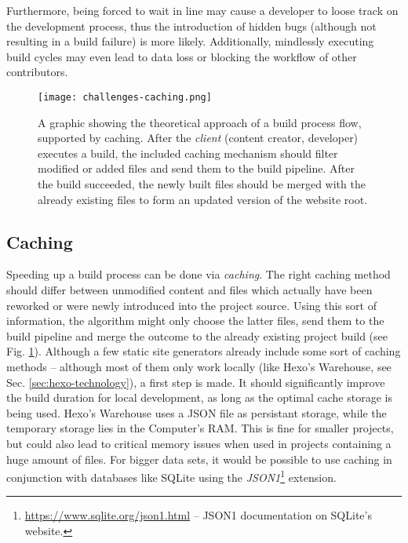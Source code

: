 Furthermore, being forced to wait in line may cause a developer to loose track on the development process, thus the introduction of hidden bugs (although not resulting in a build failure) is more likely. Additionally, mindlessly executing build cycles may even lead to data loss or blocking the workflow of other contributors.

\begin{figure} %
    \centering
    \texttt{[image: challenges-caching.png]}
    \caption{A graphic showing the theoretical approach of a build process flow, supported by caching. After the \emph{client} (content creator, developer) executes a build, the included caching mechanism should filter modified or added files and send them to the build pipeline. After the build succeeded, the newly built files should be merged with the already existing files to form an updated version of the website root.}
    \label{fig:caching}
\end{figure}
%

\subsection{Caching}
\label{sec:challenges-caching}
Speeding up a build process can be done via \emph{caching}. The right caching method should differ between unmodified content and files which actually have been reworked or were newly introduced into the project source. Using this sort of information, the algorithm might only choose the latter files, send them to the build pipeline and merge the outcome to the already existing project build (see Fig. \ref{fig:caching}).
Although a few static site generators already include some sort of caching methods -- although most of them only work locally (like Hexo's Warehouse, see Sec. \ref{sec:hexo-technology}), a first step is made. It should significantly improve the build duration for local development, as long as the optimal cache storage is being used. Hexo's Warehouse uses a JSON file as persistant storage, while the temporary storage lies in the Computer's RAM. This is fine for smaller projects, but could also lead to critical memory issues when used in projects containing a huge amount of files. For bigger data sets, it would be possible to use caching in conjunction with databases like SQLite using the \emph{JSON1}\footnote{\url{https://www.sqlite.org/json1.html} -- JSON1 documentation on SQLite's website.} extension.


